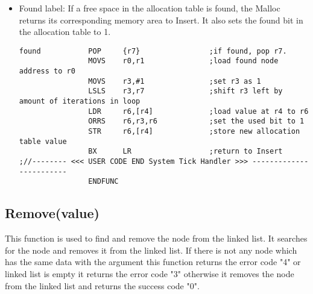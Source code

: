 \documentclass[pdftex,12pt,a4paper]{article}
\begin{document}
\begin{itemize}
\item Found label: If a free space in the allocation table is found, the Malloc returns its corresponding memory area to Insert. It also sets the found bit in the allocation table to 1.

\begin{lstlisting}[caption=Malloc found label, style=customasm]
found			POP		{r7}				;if found, pop r7.
				MOVS 	r0,r1				;load found node address to r0
				MOVS	r3,#1				;set r3 as 1
				LSLS	r3,r7				;shift r3 left by amount of iterations in loop
				LDR		r6,[r4]				;load value at r4 to r6
				ORRS	r6,r3,r6			;set the used bit to 1
				STR		r6,[r4]				;store new allocation table value
				BX	 	LR					;return to Insert
;//-------- <<< USER CODE END System Tick Handler >>> ------------------------				
				ENDFUNC
\end{lstlisting}
\end{itemize}
\subsection{Remove(value)}
\par This function is used to find and remove the node from the linked list. It searches for the node and removes it from the linked list. If there is not any node which has the same data with the argument this function returns the error code "4" or linked list is empty it returns the error code "3" otherwise it removes the node from the linked list and returns the success code "0".
\end{document}
